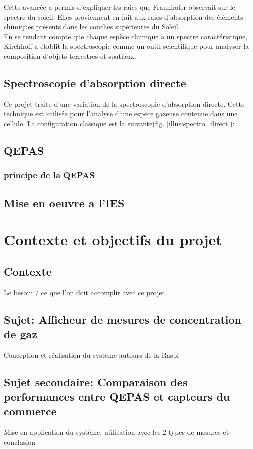 \documentclass[a4paper]{report}
\begin{document}
	Cette avancée a permis d'expliquer les raies que Fraunhofer observait sur le spectre du soleil. Elles proviennent en fait aux raies d'absorption des éléments chimiques présents dans les couches supérieures du Soleil.\\
	En se rendant compte que chaque espèce chimique a un spectre caractéristique, Kirchhoff a établit la spectroscopie comme un outil scientifique pour analyser la composition d'objets terrestres et spatiaux.
	\section{Spectroscopie d'absorption directe}
	Ce projet traite d'une variation de la spectroscopie d'absorption directe. Cette technique est utilisée pour l'analyse d'une espèce gazeuse contenue dans une cellule. La configuration classique est la suivante(fig. \ref{illus:spectro_direct}):
	
	\section{QEPAS}
		\subsection{principe de la QEPAS}
			
	\section{Mise en oeuvre a l'IES}

	\chapter{Contexte et objectifs du projet}

	
	\section{Contexte}
	Le besoin / ce que l'on doit accomplir avec ce projet
	
	\section{Sujet: Afficheur de mesures de concentration de gaz}
	Conception et réalisation du système autours de la Raspi
		
	\section{Sujet secondaire: Comparaison des performances entre QEPAS et capteurs du commerce}
	Mise en application du système, utilisation avec les 2 types de mesures et conclusion
	
\end{document}
